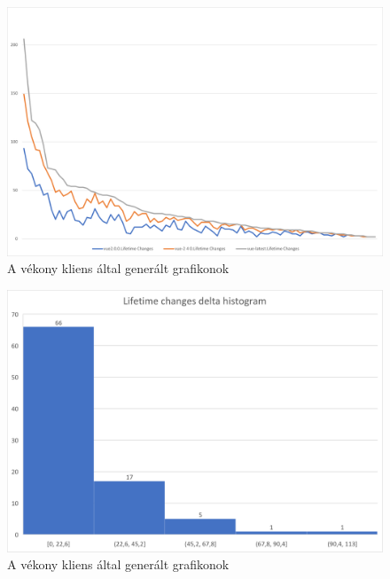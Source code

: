 \begin{figure}[H]
    \centering
    \includegraphics[width=1\textwidth]{images/vue/vue-all-lifetime-changes-comp-full.png}
    \caption{A vékony kliens által generált grafikonok}
    \label{fig:hestia-charts}
\end{figure}

\begin{figure}[H]
    \centering
    \includegraphics[width=1\textwidth]{images/vue/vue-all-lifetime-changes-delta-hist.png}
    \caption{A vékony kliens által generált grafikonok}
    \label{fig:hestia-charts}
\end{figure}

